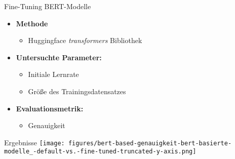 \documentclass[aspectratio=169]{beamer} %
\begin{document}
\begin{frame}{Fine-Tuning BERT-Modelle}
\begin{itemize}
        \item \textbf{Methode}
            \begin{itemize}
                \item Huggingface \textit{transformers} Bibliothek
            \end{itemize}
        \item \textbf{Untersuchte Parameter:}
        \begin{itemize}
            \item Initiale Lernrate
            \item Größe des Trainingsdatensatzes
        \end{itemize}
        \item \textbf{Evaluationsmetrik:}
        \begin{itemize}
            \item Genauigkeit
        \end{itemize}
\end{itemize}  
\end{frame}


\begin{frame}{Ergebnisse}
    \centering
     \texttt{[image: figures/bert-based-genauigkeit-bert-basierte-modelle\_-default-vs.-fine-tuned-truncated-y-axis.png]}
\end{frame}





\end{document}
